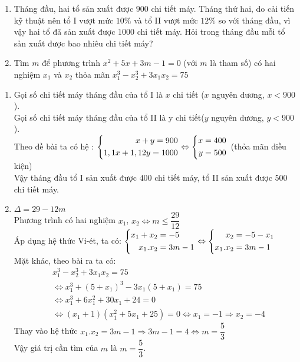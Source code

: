 \begin{ex}%
   \hfill
    \begin{enumerate}[1)]
   	\item  Tháng đầu, hai tổ sản xuất được $900$ chi tiết máy. Tháng thứ hai, do cải tiến kỹ thuật nên tổ I vượt mức $10\%$ và tổ II vượt mức $12\%$ so với tháng đầu, vì vậy hai tổ đã sản xuất được $1000$ chi tiết máy. Hỏi trong tháng đầu mỗi tổ sản xuất được bao nhiêu chi tiết máy? 
   	\item Tìm $m$ để phương trình $x^2+5x+3m-1=0$ (với $m$ là tham số) có hai nghiệm $x_1$ và $x_2$ thỏa mãn $x^3_1-x^3_2+3x_1x_2=75$
   \end{enumerate}
  \loigiai
    {
    	\begin{enumerate}[1)]
    		\item  Gọi số chi tiết máy tháng đầu của tổ I là $x$ chi tiết ($x$ nguyên dương, $x<900$).\\
    		Gọi số chi tiết máy tháng đầu của tổ II là y chi tiết($y$ nguyên dương, $y<900$).\\
    		Theo đề bài ta có hệ : $\left\{\begin{aligned}x+y=900\\1,1x+1,12y=1000\end{aligned}\right.\Leftrightarrow \left\{\begin{aligned}x=400\\y=500\end{aligned}\right.$ (thỏa mãn điều kiện)\\
    		Vậy tháng đầu tổ I sản xuất được $400$ chi tiết máy, tổ II sản xuất được $500$ chi tiết máy.
    		\item $\Delta= 29-12m$\\
Phương trình có hai nghiệm $x_1$, $x_2\Leftrightarrow m\leq \dfrac{29}{12}$\\
Áp dụng hệ thức Vi-ét, ta có: $\left\{\begin{aligned}x_1+x_2&=-5\\x_1.x_2&=3m-1\end{aligned}\right.\Leftrightarrow \left\{\begin{aligned}x_2&=-5-x_1\\x_1.x_2&=3m-1\end{aligned}\right.$\\
Mặt khác, theo bài ra ta có: 
\begin{align*}
&x^3_1-x^3_2+3x_1x_2=75\\
&\Leftrightarrow x^3_1+(5+x_1)^3-3x_1(5+x_1)=75\\
&\Leftrightarrow x^3_1+6x^2_1+30x_1+24=0\\
&\Leftrightarrow (x_1+1)(x^2_1+5x_1+25)=0\Leftrightarrow x_1=-1\Rightarrow x_2=-4
\end{align*}   		
Thay vào hệ thức $x_1.x_2=3m-1\Rightarrow 3m-1=4\Leftrightarrow m=\dfrac{5}{3}$\\
Vậy giá trị cần tìm của $m$ là $m=\dfrac{5}{3}$.    		   	
    	\end{enumerate}
    }
\end{ex}

